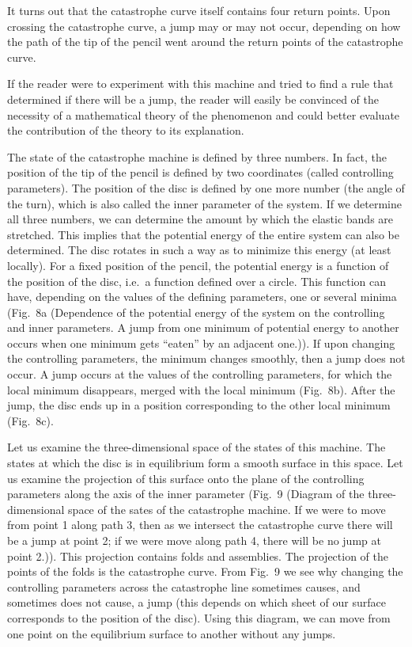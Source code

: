 \documentclass[12pt]{amsart}
\begin{document}
It turns out that the catastrophe curve itself contains four return points.
Upon crossing the catastrophe curve, a jump may or may not occur, depending on
how the path of the tip of the pencil went around the return points of the
catastrophe curve.

If the reader were to experiment with this machine and tried to find a rule that
determined if there will be a jump, the reader will easily be convinced of the
necessity of a mathematical theory of the phenomenon and could better evaluate
the contribution of the theory to its explanation.

The state of the catastrophe machine is defined by three numbers.
In fact, the position of the tip of the pencil is defined by two coordinates
(called controlling parameters).
The position of the disc is defined by one more number (the angle of the turn),
which is also called the inner parameter of the system.
If we determine all three numbers, we can determine the amount by which the
elastic bands are stretched.
This implies that the potential energy of the entire system can also be
determined.
The disc rotates in such a way as to minimize this energy (at least locally).
For a fixed position of the pencil, the potential energy is a function of the
position of the disc, i.e.\ a function defined over a circle.
This function can have, depending on the values of the defining parameters,
one or several minima (Fig.\ 8a (Dependence of the potential energy of the system
on the controlling and inner parameters.
A jump from one minimum of potential energy to another occurs when one minimum
gets ``eaten'' by an adjacent one.)).
If upon changing the controlling parameters, the minimum changes smoothly, then
a jump does not occur.
A jump occurs at the values of the controlling parameters, for which the local
minimum disappears, merged with the local minimum (Fig.\ 8b).
After the jump, the disc ends up in a position corresponding to the other local
minimum (Fig.\ 8c).

Let us examine the three-dimensional space of the states of this machine.
The states at which the disc is in equilibrium form a smooth surface in this
space.
Let us examine the projection of this surface onto the plane of the controlling
parameters along the axis of the inner parameter (Fig.\ 9 (Diagram of the
three-dimensional space of the sates of the catastrophe machine.
If we were to move from point 1 along path 3, then as we intersect the
catastrophe curve there will be a jump at point 2; if we were move along path 4,
there will be no jump at point 2.)).
This projection contains folds and assemblies.
The projection of the points of the folds is the catastrophe curve.
From Fig.\ 9 we see why changing the controlling parameters across the
catastrophe line sometimes causes, and sometimes does not cause, a jump (this
depends on which sheet of our surface corresponds to the position of the disc).
Using this diagram, we can move from one point on the equilibrium surface to
another without any jumps.
\end{document}
